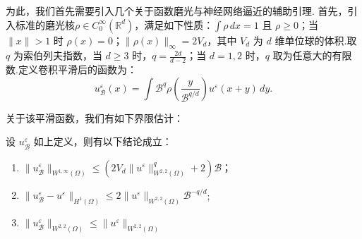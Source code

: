 为此，我们首先需要引入几个关于函数磨光与神经网络逼近的辅助引理.
首先，引入标准的磨光核$\rho\in C_{0}^{\infty}(\mathbb{R}^d)$，满足如下性质：$\int \rho\,dx=1$ 且 $\rho \geq 0$；当 $\|x\|> 1$ 时 $\rho(x) = 0$；$\|\rho(x)\|_{\infty}=2V_{d}$，其中 $V_{d}$ 为 $d$ 维单位球的体积.取 $q$ 为索伯列夫指数，当 $d\geq3$ 时，$q = \frac{2d}{d-2}$；当 $d=1,2$ 时，$q$ 取为任意大的有限数.定义卷积平滑后的函数为：
\begin{equation*}
u^{\varepsilon}_{\mathcal{B}}(x)=\int \mathcal{B}^{q}\rho\left(\frac{y}{\mathcal{B}^{q/d}}\right)u^{\varepsilon}(x+y)\,dy.
\end{equation*}

关于该平滑函数，我们有如下界限估计：
\begin{lemma}[截断与平滑估计]\label{lemma:modifier} 设 $u^{\varepsilon}_{\mathcal{B}}$ 如上定义，则有以下结论成立：
\begin{enumerate}
    \item $\|u^{\varepsilon}_{\mathcal{B}}\|_{W^{1,\infty}(\Omega)}\leq \left(2V_{d}\|u^{\varepsilon}\|_{W^{2,2}(\Omega)}^{q}+2\right)\mathcal{B}$；
    \item $\|u^{\varepsilon}_{\mathcal{B}}-u^{\varepsilon}\|_{H^{1}(\Omega)}\leq 2\|u^{\varepsilon}\|_{W^{2,2}(\Omega)}\mathcal{B}^{-q/d}$;
    \item $\|u^{\varepsilon}_{\mathcal{B}}\|_{W^{2,2}(\Omega)}\leq \|u^{\varepsilon}\|_{W^{2,2}(\Omega)}$
\end{enumerate}
\end{lemma}
